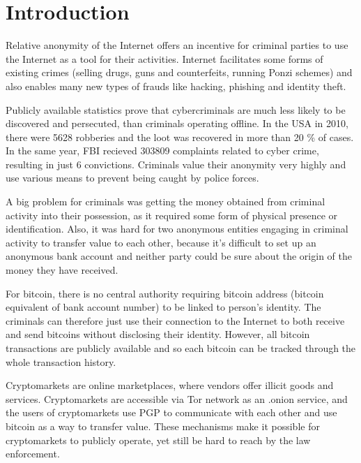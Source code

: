 \documentclass[
  digital, %
  table,   %
  lof,     %
  lot,     %
  oneside
]{fithesis3}
\begin{document}
\chapter{Introduction}

Relative anonymity of the Internet offers an incentive for criminal parties
to use the Internet as a tool for their activities.
Internet facilitates some forms of existing crimes (selling drugs, guns and
counterfeits, running Ponzi schemes) and also enables many new types of frauds like hacking, phishing and identity theft.

Publicly available statistics prove that cybercriminals are much
 less likely to be discovered and persecuted, than criminals operating offline.
 In the USA in 2010, there were 5628 robberies and the loot was recovered in more than 20 \% of cases. \parencite{fbi10} 
 In the same year, FBI recieved 303809 complaints related to cyber crime, resulting in just 6 convictions. \parencite{fbcyber} 
Criminals value their anonymity very highly and use various means to prevent being caught by police forces.
\parencite{tzanetakis2016transparency}
\parencite{van2013surfing}
\parencite{aldridge2014not}

A big problem for criminals was getting the money obtained from criminal activity into their possession,
as it required some form of physical presence or identification.
Also, it was hard for two anonymous entities engaging in criminal activity to transfer value to each other,
 because it's difficult to set up an anonymous bank account and neither party could be sure about the origin of
 the money they have received.

For bitcoin, there is no central authority requiring bitcoin address
(bitcoin equivalent of bank account number) to be linked to person's identity. The criminals can therefore 
just use their connection to the Internet to both receive and send bitcoins without disclosing their identity.
However, all bitcoin transactions are publicly available and so each bitcoin can be tracked through the whole transaction history.

 Cryptomarkets are online marketplaces, where vendors offer illicit goods and services.
 Cryptomarkets are accessible via Tor network as an .onion service, and the users of
 cryptomarkets use PGP to communicate with each other and use bitcoin as a way to transfer value.
These mechanisms make it possible for cryptomarkets to publicly operate, yet still be hard to reach by the law enforcement.
\parencite{cox2016staying}
\end{document}
